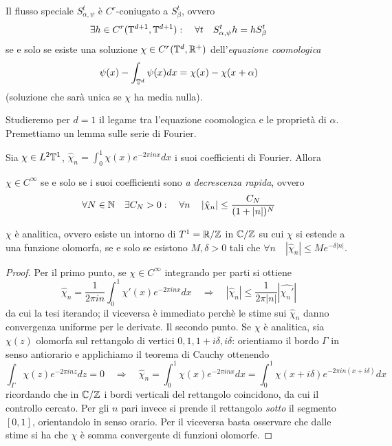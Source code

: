 \begin{teo}Il flusso speciale $S^t_{\alpha,\psi}$ è $C^r$-coniugato a $S^t_\beta$, ovvero
 \[\exists h\in C^r(\mathbb{T}^{d+1},\mathbb{T}^{d+1}):\quad \forall t \quad S^t_{\alpha,\psi}h=hS^t_\beta\]
 se e solo se esiste una soluzione $\chi\in C^r(\mathbb{T}^d,\mathbb{R}^+)$ dell'\emph{equazione coomologica}
 \[\psi(x)-\int_{\mathbb{T}^d}\psi(x)dx=\chi(x)-\chi(x+\alpha)\]
 (soluzione che sarà unica se $\chi$ ha media nulla).
\end{teo}

Studieremo per $d=1$ il legame tra l'equazione coomologica e le proprietà di $\alpha$. Premettiamo un lemma sulle serie di Fourier.

\begin{teo}Sia $\chi\in L^2\mathbb{T}^1$, $\hat\chi_n=\int_0^1\chi(x)e^{-2\pi inx}dx$ i suoi coefficienti di Fourier. Allora
\begin{lista}
 \item $\chi\in C^\infty$ se e solo se i suoi coefficienti sono \emph{a decrescenza rapida}, ovvero
      \[\forall N\in \mathbb{N}\quad \exists C_N>0: \quad \forall n \quad \left|\hat\chi_n\right|\leq\frac{C_N}{(1+|n|)^N}\]
 \item $\chi$ è analitica, ovvero esiste un intorno di $T^1=\mathbb{R}/\mathbb{Z}$ in $\mathbb{C}/\mathbb{Z}$ su cui $\chi$ si estende a una funzione olomorfa, se e solo se esistono $M,\delta>0$ tali che $\forall n \quad \left|\hat\chi_n\right|\leq Me^{-\delta |n|}$.
\end{lista}
\end{teo}
\begin{proof}
 Per il primo punto, se $\chi\in C^\infty$ integrando per parti si ottiene
 \[\hat\chi_n=\frac{1}{2\pi in}\int_0^1\chi'(x)e^{-2\pi inx}dx \quad \Rightarrow \quad \left|\hat\chi_n\right|\leq \frac{1}{2\pi |n|}\left|\widehat{\chi_n'}\right|\]
 da cui la tesi iterando; il viceversa è immediato perchè le stime sui $\hat\chi_n$ danno convergenza uniforme per le derivate.
 Il secondo punto. Se $\chi$ è analitica, sia $\chi(z)$ olomorfa sul rettangolo di vertici $0, 1,1+i\delta,i\delta$: orientiamo il bordo $\Gamma$ in senso antiorario e applichiamo il teorema di Cauchy ottenendo
 \[\int_\Gamma \chi(z)e^{-2\pi inz}dz=0 \quad \Rightarrow \quad \hat\chi_n=\int_0^1\chi(x)e^{-2\pi inx}dx=\int_0^1\chi(x+i\delta)e^{-2\pi in(x+i\delta)}dx\]
 ricordando che in $\mathbb{C}/\mathbb{Z}$ i bordi verticali del rettangolo coincidono, da cui il controllo cercato. Per gli $n$ pari invece si prende il rettangolo \emph{sotto} il segmento $[0,1]$, orientandolo in senso orario. Per il viceversa basta osservare che dalle stime si ha che $\chi$ è somma convergente di funzioni olomorfe. 
\end{proof}

